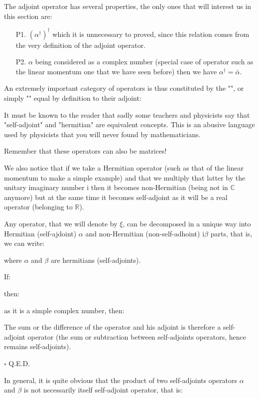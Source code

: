 	The adjoint operator has several properties, the only ones that will interest us in this section are:
	\begin{enumerate}
		\item[P1.] $(\alpha^\dagger)^\dagger$ which it is unnecessary to proved, since this relation comes from the very definition of the adjoint operator.
	
		\item[P2.] $\alpha$ being considered as a complex number (special case of operator such as the linear momentum one that we have seen before) then we have $\alpha^\dagger=\bar{\alpha}$.
	\end{enumerate}
	An extremely important category of operators is thus constituted by the "", or simply "" equal by definition to their adjoint:
	
	It must be known to the reader that sadly some teachers and physicists say	that "self-adjoint" and "hermitian" are equivalent concepts. This is an abusive language used by physicists that you will never found by mathematicians. 
	\begin{tcolorbox}[title=Remark,colframe=black,arc=10pt]
	Remember that these operators can also be matrices!
	\end{tcolorbox}
	We also notice that if we take a Hermitian operator (such as that of the linear momentum to make a simple example) and that we multiply that latter by the unitary imaginary number $\mathrm{i}$ then it becomes non-Hermitian (being not in $\mathbb{C}$ anymore) but at the same time it becomes self-adjoint as it will be a real operator (belonging to $\mathbb{R}$).
	\begin{theorem}
	Any operator, that we will denote by $\xi$, can be decomposed in a unique way into Hermitian (self-ajdoint) $\alpha$ and non-Hermitian (non-self-adhoint) $\mathrm{i}\beta$ parts, that is, we can write:
	
	where $\alpha$ and $\beta$ are hermitians (self-adjoints).
	\end{theorem}

	\begin{dem}
	If:
	
	then:
	
	as it is a simple complex number, then:
	
	The sum or the difference of the operator and his adjoint is therefore a self-adjoint operator (the sum or subtraction between self-adjoints operators, hence remains self-adjoints).
	\begin{flushright}
		$\square$  Q.E.D.
	\end{flushright}
	\end{dem}
	In general, it is quite obvious that the product of two self-adjoints operators $\alpha$ and $\beta$  is not necessarily itself self-adjoint operator, that is:
	
